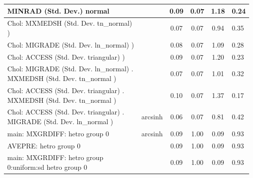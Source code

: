 \begin{table}
\begin{center}
\begin{tabular}{|l|l|c|c|c|l|}
			\hline
			MINRAD (Std. Dev.) normal &  & 0.09 & 0.07 & 1.18 & 0.24 \\
			\hline
			 Chol: MXMEDSH (Std. Dev. tn_normal) ) &  & 0.07 & 0.07 & 0.94 & 0.35 \\
			\hline
			 Chol: MIGRADE (Std. Dev. ln_normal) ) &  & 0.08 & 0.07 & 1.09 & 0.28 \\
			\hline
			 Chol: ACCESS (Std. Dev. triangular) ) &  & 0.09 & 0.07 & 1.20 & 0.23 \\
			\hline
			 Chol: MIGRADE (Std. Dev. ln_normal) . MXMEDSH (Std. Dev.   tn_normal ) &  & 0.07 & 0.07 & 1.01 & 0.32 \\
			\hline
			 Chol: ACCESS (Std. Dev. triangular) . MXMEDSH (Std. Dev.   tn_normal ) &  & 0.10 & 0.07 & 1.37 & 0.17 \\
			\hline
			 Chol: ACCESS (Std. Dev. triangular) . MIGRADE (Std. Dev.   ln_normal ) & arcsinh & 0.06 & 0.07 & 0.81 & 0.42 \\
			\hline
			main: MXGRDIFF: hetro group 0 & arcsinh & 0.09 & 1.00 & 0.09 & 0.93 \\
			\hline
			AVEPRE: hetro group 0 &  & 0.09 & 1.00 & 0.09 & 0.93 \\
			\hline
			main: MXGRDIFF: hetro group 0:uniform:sd  hetro group 0 &  & 0.09 & 1.00 & 0.09 & 0.93 \\
			\hline
		\end{tabular}
	\end{center}
\end{table}